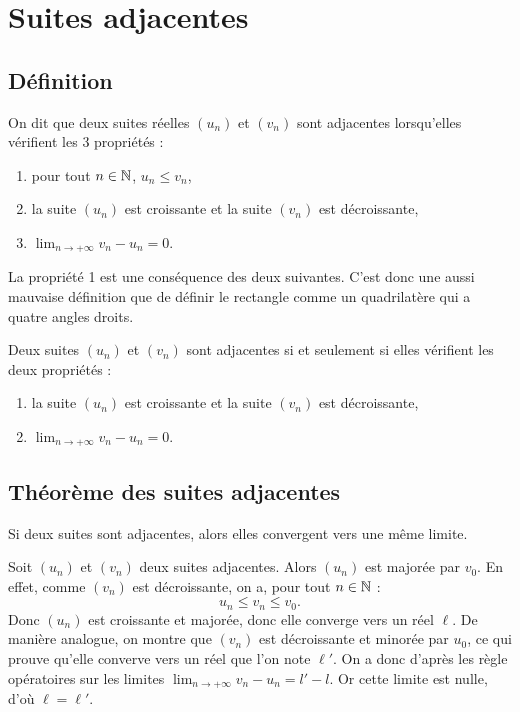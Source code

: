 \documentclass[a4paper,11pt,DIV14,BCOR0mm]{scrartcl}
\begin{document}
\section{Suites adjacentes}
\subsection{Définition}
\begin{definition}
 On dit que deux suites réelles $(u_n)$ et $(v_n)$ sont adjacentes lorsqu'elles
vérifient les 3 propriétés :
\begin{enumerate}
 \item pour tout $n\in \mathbb{N}$, $u_n\leq v_n$,
 \item la suite $(u_n)$ est croissante et la suite $(v_n)$ est décroissante,
  \item $\displaystyle\lim_{n\to+\infty}v_n-u_n=0$.
\end{enumerate}
\end{definition}
\vspace{1cm}
\hfill {} \hfill
\vfill
\vspace{1cm}
\begin{remarque}
 La propriété 1 est une conséquence des deux suivantes. C'est donc une aussi mauvaise définition
que de définir le rectangle comme un quadrilatère qui a quatre angles droits. 
\end{remarque}

\begin{theoreme}[admis]
 Deux suites $(u_n)$ et $(v_n)$ sont adjacentes si et seulement si 
elles vérifient les deux propriétés :
\begin{enumerate}
 \item la suite $(u_n)$ est croissante et la suite $(v_n)$ est décroissante,
  \item $\displaystyle\lim_{n\to+\infty}v_n-u_n=0$.
\end{enumerate}
\end{theoreme}

\subsection{Théorème des suites adjacentes}
\begin{theoreme}
 Si deux suites sont adjacentes, alors elles convergent vers une même limite.
\end{theoreme}
\begin{demonstration}
 Soit $(u_n)$ et $(v_n)$ deux suites adjacentes. Alors $(u_n)$ est majorée par 
$v_0$. En effet, comme $(v_n)$ est décroissante, on a, pour tout $n\in\mathbb{N}$ :
\[
 u_n\leq v_n \leq v_0.
\]
Donc $(u_n)$ est croissante et majorée, donc elle converge vers un réel $\ell$.
De manière analogue, on montre que $(v_n)$ est décroissante et minorée par
$u_0$, ce qui prouve qu'elle converve vers un réel que l'on note $\ell'$.
On a donc d'après les règle opératoires sur les limites $\displaystyle\lim_{n\to+\infty}v_n-u_n=l'-l$.
Or cette limite est nulle, d'o\`u $\ell=\ell'$.
\end{demonstration}
\pagebreak
\end{document}
